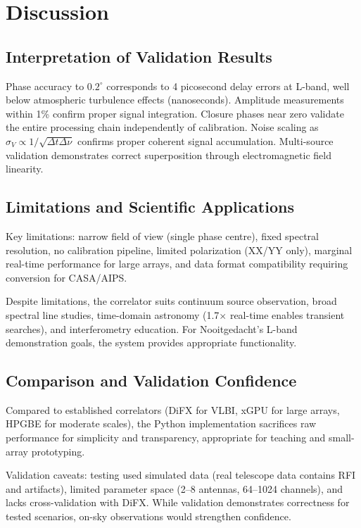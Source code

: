 \section{Discussion}

\subsection{Interpretation of Validation Results}

Phase accuracy to $0.2^\circ$ corresponds to 4 picosecond delay errors at L-band, well below atmospheric turbulence effects (nanoseconds). Amplitude measurements within 1\% confirm proper signal integration. Closure phases near zero validate the entire processing chain independently of calibration. Noise scaling as $\sigma_V \propto 1/\sqrt{\Delta t \Delta\nu}$ confirms proper coherent signal accumulation. Multi-source validation demonstrates correct superposition through electromagnetic field linearity.

\subsection{Limitations and Scientific Applications}

Key limitations: narrow field of view (single phase centre), fixed spectral resolution, no calibration pipeline, limited polarization (XX/YY only), marginal real-time performance for large arrays, and data format compatibility requiring conversion for CASA/AIPS.

Despite limitations, the correlator suits continuum source observation, broad spectral line studies, time-domain astronomy (1.7$\times$ real-time enables transient searches), and interferometry education. For Nooitgedacht's L-band demonstration goals, the system provides appropriate functionality.

\subsection{Comparison and Validation Confidence}

Compared to established correlators (DiFX for VLBI, xGPU for large arrays, HPGBE for moderate scales), the Python implementation sacrifices raw performance for simplicity and transparency, appropriate for teaching and small-array prototyping.

Validation caveats: testing used simulated data (real telescope data contains RFI and artifacts), limited parameter space (2–8 antennas, 64–1024 channels), and lacks cross-validation with DiFX. While validation demonstrates correctness for tested scenarios, on-sky observations would strengthen confidence.

